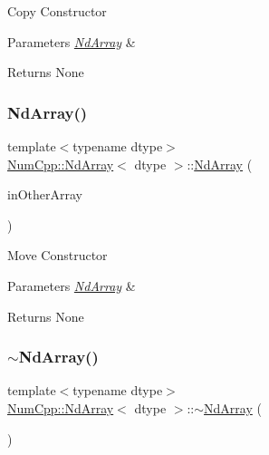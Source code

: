 Copy Constructor


\begin{DoxyParams}{Parameters}
{\em \mbox{\hyperlink{class_num_cpp_1_1_nd_array}{Nd\+Array}}} & \\
\hline
\end{DoxyParams}
\begin{DoxyReturn}{Returns}
None 
\end{DoxyReturn}
\mbox{\label{class_num_cpp_1_1_nd_array_a6ba19b23ddaeeb27fe862ffd1e9792ad}} 
\subsubsection{\texorpdfstring{Nd\+Array()}{NdArray()}\hspace{0.1cm}{\footnotesize\ttfamily [12/12]}}
{\footnotesize\ttfamily template$<$typename dtype$>$ \\
\mbox{\hyperlink{class_num_cpp_1_1_nd_array}{Num\+Cpp\+::\+Nd\+Array}}$<$ dtype $>$\+::\mbox{\hyperlink{class_num_cpp_1_1_nd_array}{Nd\+Array}} (\begin{DoxyParamCaption}\item[{\mbox{\hyperlink{class_num_cpp_1_1_nd_array}{Nd\+Array}}$<$ dtype $>$ \&\&}]{in\+Other\+Array }\end{DoxyParamCaption})\hspace{0.3cm}{\ttfamily [inline]}}

Move Constructor


\begin{DoxyParams}{Parameters}
{\em \mbox{\hyperlink{class_num_cpp_1_1_nd_array}{Nd\+Array}}} & \\
\hline
\end{DoxyParams}
\begin{DoxyReturn}{Returns}
None 
\end{DoxyReturn}
\mbox{\label{class_num_cpp_1_1_nd_array_a1a4122a082441d304753e11355971f92}} 
\subsubsection{\texorpdfstring{$\sim$\+Nd\+Array()}{~NdArray()}}
{\footnotesize\ttfamily template$<$typename dtype$>$ \\
\mbox{\hyperlink{class_num_cpp_1_1_nd_array}{Num\+Cpp\+::\+Nd\+Array}}$<$ dtype $>$\+::$\sim$\mbox{\hyperlink{class_num_cpp_1_1_nd_array}{Nd\+Array}} (\begin{DoxyParamCaption}{ }\end{DoxyParamCaption})\hspace{0.3cm}{\ttfamily [inline]}}

